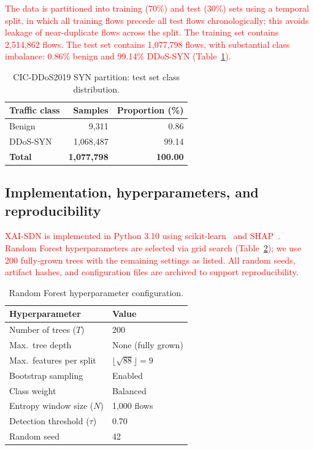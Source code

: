 \documentclass{ieeeaccess}
\begin{document}
\textcolor{red}{The data is partitioned into training (70\%) and test (30\%) sets using a temporal split, in which all training flows precede all test flows chronologically; this avoids leakage of near-duplicate flows across the split. The training set contains 2,514,862 flows. The test set contains 1,077,798 flows, with substantial class imbalance: 0.86\% benign and 99.14\% DDoS-SYN (Table~\ref{tab:dataset}).}

\begin{table}
\caption{CIC-DDoS2019 SYN partition: test set class distribution.}
\centering
\label{tab:dataset}
\small
\setlength{\tabcolsep}{6pt}
\renewcommand{\arraystretch}{1.25}
\begin{tabular}{@{}lrr@{}}
\toprule
\textbf{Traffic class} & \textbf{Samples} & \textbf{Proportion (\%)} \\
\midrule
Benign & 9,311 & 0.86 \\
DDoS-SYN & 1,068,487 & 99.14 \\
\midrule
\textbf{Total} & \textbf{1,077,798} & \textbf{100.00} \\
\bottomrule
\end{tabular}
\end{table}

\subsection{Implementation, hyperparameters, and reproducibility}
\textcolor{red}{XAI-SDN is implemented in Python 3.10 using scikit-learn~\cite{pedregosa2011sklearn} and SHAP~\cite{lundberg2017shap}. Random Forest hyperparameters are selected via grid search (Table~\ref{tab:hyperparams}); we use 200 fully-grown trees with the remaining settings as listed. All random seeds, artifact hashes, and configuration files are archived to support reproducibility.}

\begin{table}
\caption{Random Forest hyperparameter configuration.}
\centering
\label{tab:hyperparams}
\small
\setlength{\tabcolsep}{6pt}
\renewcommand{\arraystretch}{1.25}
\begin{tabular}{@{}ll@{}}
\toprule
\textbf{Hyperparameter} & \textbf{Value} \\
\midrule
Number of trees ($T$) & 200 \\
Max.\ tree depth & None (fully grown) \\
Max.\ features per split & $\lfloor\sqrt{88}\rfloor = 9$ \\
Bootstrap sampling & Enabled \\
Class weight & Balanced \\
Entropy window size ($N$) & 1,000 flows \\
Detection threshold ($\tau$) & 0.70 \\
Random seed & 42 \\
\bottomrule
\end{tabular}
\end{table}
\end{document}
